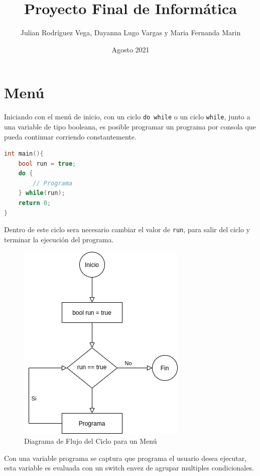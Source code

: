 \documentclass[12pt]{article}
\title{Proyecto Final de Informática}
\author{Julian Rodríguez Vega, Dayanna Lugo Vargas y Maria Fernanda Marin}
\date{Agosto 2021}
\begin{document}
\begin{titlepage}
\maketitle
\end{titlepage}

\section{Menú}

Iniciando con el menú de inicio, con un ciclo \verb+do while+ o un ciclo \verb+while+, junto a una variable de tipo booleana, es posible programar un programa por consola que pueda continuar corriendo constantemente.

\begin{lstlisting}[language=c++]
int main(){
    bool run = true;
    do {
        // Programa
    } while(run);
    return 0;
}
\end{lstlisting}

Dentro de este ciclo  sera necesario cambiar el valor de \verb+run+, para salir del ciclo y terminar la ejecución del programa.

\begin{figure}[h]
    \caption{Diagrama de Flujo del Ciclo para un Menú}
    \centering
    \includegraphics[scale=0.8]{menu_loop.png}
\end{figure}

Con una variable programa se captura que programa el usuario desea ejecutar, esta variable es evaluada con un switch envez de agrupar multiples condicionales.
\end{document}
